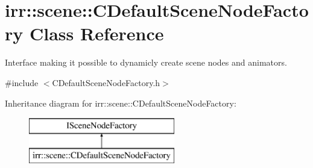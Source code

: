 \hypertarget{classirr_1_1scene_1_1_c_default_scene_node_factory}{\section{irr\-:\-:scene\-:\-:C\-Default\-Scene\-Node\-Factory Class Reference}
\label{classirr_1_1scene_1_1_c_default_scene_node_factory}
}


Interface making it possible to dynamicly create scene nodes and animators.  




{\ttfamily \#include $<$C\-Default\-Scene\-Node\-Factory.\-h$>$}

Inheritance diagram for irr\-:\-:scene\-:\-:C\-Default\-Scene\-Node\-Factory\-:\begin{figure}[H]
\begin{center}
\leavevmode
\includegraphics[height=2.000000cm]{classirr_1_1scene_1_1_c_default_scene_node_factory}
\end{center}
\end{figure}

